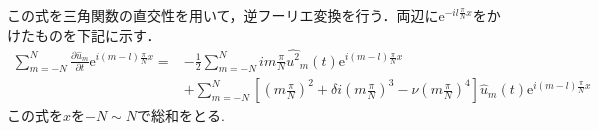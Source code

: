 \documentclass[autodetect-engine,dvipdfmx-if-dvi,ja=standard,a4paper,11pt]{bxjsarticle} %
\begin{document}
この式を三角関数の直交性を用いて，逆フーリエ変換を行う．両辺に$\mathrm{e}^{-il\frac{\pi}{N}x}$をかけたものを下記に示す．
\begin{equation}
\begin{split}
\displaystyle\sum_{m=-N}^N\frac{\partial \hat{u}_m}{\partial t} \mathrm{e}^{i(m-l)\frac{\pi}{N}x}=&-\frac{1}{2}\displaystyle\sum_{m=-N}^Nim\frac{\pi}{N}\hat{u^2}_m(t) \mathrm{e}^{i(m-l)\frac{\pi}{N}x}\\
&+\displaystyle\sum_{m=-N}^N\left[\left(m\frac{\pi}{N}\right)^2+\delta i\left(m\frac{\pi}{N}\right)^3-\nu \left(m\frac{\pi}{N}\right)^4\right]\hat{u}_m(t) \mathrm{e}^{i(m-l)\frac{\pi}{N}x}
\label{eq:gkslifft}
\end{split}
\end{equation}
この式を$x$を$-N\sim N$で総和をとる. 

\newpage
\end{document}
